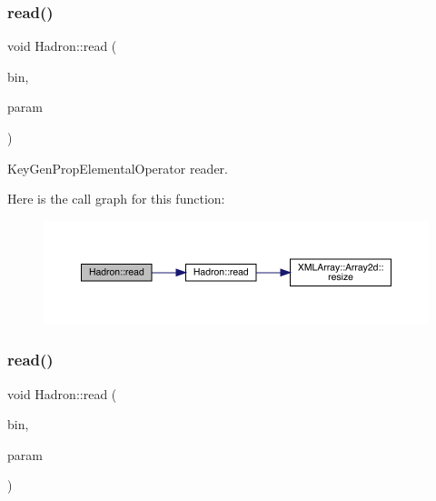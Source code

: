 \subsubsection{\texorpdfstring{read()}{read()}\hspace{0.1cm}{\footnotesize\ttfamily [56/94]}}
{\footnotesize\ttfamily void Hadron\+::read (\begin{DoxyParamCaption}\item[{\mbox{\hyperlink{classADATIO_1_1BinaryReader}{Binary\+Reader}} \&}]{bin,  }\item[{\mbox{\hyperlink{structHadron_1_1KeyGenPropElementalOperator__t}{Key\+Gen\+Prop\+Elemental\+Operator\+\_\+t}} \&}]{param }\end{DoxyParamCaption})}



Key\+Gen\+Prop\+Elemental\+Operator reader. 

Here is the call graph for this function\+:\nopagebreak
\begin{figure}[H]
\begin{center}
\leavevmode
\includegraphics[width=350pt]{d1/daf/namespaceHadron_ac6d19c651cf61c129b5cf86c15d13ab5_cgraph}
\end{center}
\end{figure}
\mbox{\label{namespaceHadron_a614faa9c1c7ae1880f009d5c9aa672ec}} 
\subsubsection{\texorpdfstring{read()}{read()}\hspace{0.1cm}{\footnotesize\ttfamily [57/94]}}
{\footnotesize\ttfamily void Hadron\+::read (\begin{DoxyParamCaption}\item[{\mbox{\hyperlink{classADATIO_1_1BinaryReader}{Binary\+Reader}} \&}]{bin,  }\item[{\mbox{\hyperlink{structHadron_1_1ValTetraQuarkElementalOperator__t}{Val\+Tetra\+Quark\+Elemental\+Operator\+\_\+t}} \&}]{param }\end{DoxyParamCaption})}



